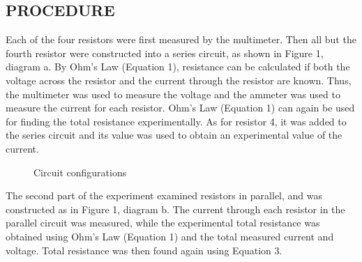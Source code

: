 \documentclass [12pt, letterpaper, twoside] {article}
\begin{document}
\subsection* {PROCEDURE}
Each of the four resistors were first measured by the multimeter. Then all but the fourth resistor were constructed into a series circuit, as shown in Figure 1, diagram a. By Ohm's Law (Equation 1), resistance can be calculated if both the voltage across the resistor and the current through the resistor are known. Thus, the multimeter was used to measure the voltage and the ammeter was used to measure the current for each resistor. Ohm's Law (Equation 1) can again be used for finding the total resistance experimentally. As for resistor 4, it was added to the series circuit and its value was used to obtain an experimental value of the current.

\begin{figure}
  \centering
  \qquad
  \qquad
  \caption{Circuit configurations}
\end{figure}

The second part of the experiment examined resistors in parallel, and was constructed as in Figure 1, diagram b. The current through each resistor in the parallel circuit was measured, while the experimental total resistance was obtained using Ohm's Law (Equation 1) and the total measured current and voltage. Total resistance was then found again using Equation 3.
\end{document}

